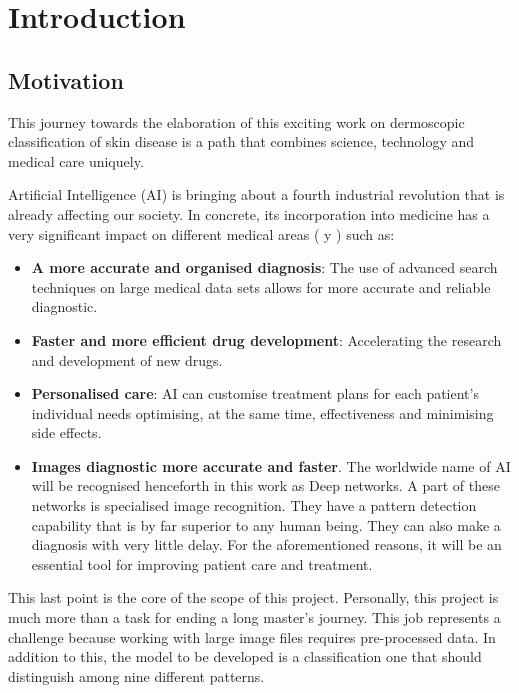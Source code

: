 \chapter{Introduction}
\label{chapter:introduction}




\section{Motivation}

This journey towards the elaboration of this exciting work on dermoscopic classification of skin disease is a path that combines science, technology and medical care uniquely. 

Artificial Intelligence (AI) is bringing about a fourth industrial revolution that is already affecting our society. In concrete, its incorporation into medicine has a very significant impact on different medical areas (\cite{luciaclemares_que_2023} y \cite{apd_aplicaciones_IA_Medicina}) such as:

\begin{itemize}
    \item \textbf{A more accurate and organised diagnosis}: The use of advanced search techniques on large medical data sets allows for more accurate and reliable diagnostic. 
    \item \textbf{Faster and more efficient drug development}: Accelerating the research and development of new drugs.
    \item \textbf{Personalised care}: AI can customise treatment plans for each patient's individual needs optimising, at the same time, effectiveness and minimising side effects.
    \item \textbf{Images diagnostic more accurate and faster}. The worldwide name of AI will be recognised henceforth in this work as Deep networks. A part of these networks is specialised image recognition. They have a pattern detection capability that is by far superior to any human being. They can also make a diagnosis with very little delay. For the aforementioned reasons, it will be an essential tool for improving patient care and treatment. 
\end{itemize}

This last point is the core of the scope of this project. Personally, this project is much more than a task for ending a long master's journey. This job represents a challenge because working with large image files requires pre-processed data. In addition to this, the model to be developed is a classification one that should distinguish among nine different patterns.

